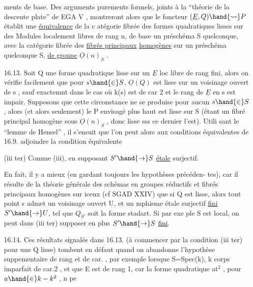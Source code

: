 
ments de base. Des arguments purements formels, joints à la
``théorie de la descente plate'' de EGA V  , montreront alors que le foncteur
$(\underline{E},Q) \hand{\rightsquigarrow} P$ établit une \uline{équivalence} de la c atégorie fibrée des formes
quadratiques lisses sur des Modules localement libres de rang n, de base
un préschéma S quelconque, avec la catégorie fibrée des \uline{fibrés principaux}
\uline{homogènes} sur un préschéma quelconque S, \uline{de groupe} $\underline{O}(n)_S$ .

16.13. Soit Q une forme quadratique lisse sur un $\underline{E}$ loc libre de
rang fini, alors on vérifie facilement que pour $s \hand{\in} S$, $\underline{O}(Q)$ est lisse
sur un voisinage ouvert de s ,  sauf exactemnt dans
le cas où k(s) est de car 2 et le rang de $\underline{E}$ en s est impair. Supposons
que cette circonstance ne se produise pour aucun $s \hand{\in} S$, alors (et alors
seulement) le P envisagé plus haut est lisse sur S (étant un fibré
principal homogène sous $\underline{O}(n)_S$ , donc lisse sss ce dernier l'est). Utili
sant le ``lemme de Hensel'' , il s'ensuit que  l'on peut alors aux
conditions équivalentes de 16.9. adjoindre la condition  équivalente

(iii ter)  Comme (iii), en supposant $S' \hand{\to} S$
\uline{étale} surjectif.

En fait, il y a mieux (en gardant toujours les hypothèses précéden-%
tes), car il résulte de la théorie générale des schémas en groupes réductifs
et fibrés principaux homogènes sur iceux (cf SGAD XXIV) que  si Q est
lisse, alors tout point s admet un voisinage ouvert U, et un mphisme
étale surjectif \uline{fini} $S' \hand{\to} U$, tel que $Q_{S'}$ soit la forme stadart. Si par exe
ple S est local, on peut dans (iii ter) supposer en plus $S' \hand{\to} S$ \uline{fini}.

16.14. Ces résultats signalés dans 16.13. (à commencer par la condition (iii ter) pour une Q
lisse)\hand{,} tombent en défaut quand on abandonne l'hypothèse suppementaire
de rang et de car. , par exemple lorsque S=Spec(k), k corps imparfait de car.2 , et
que E est de rang 1, car la forme quadratique at$^{2}$ , pour $a\hand{\in} k - k^{2}$ , n pe

